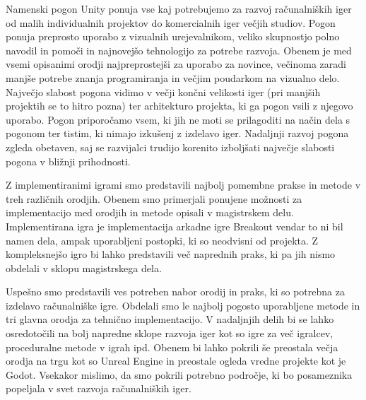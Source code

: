 \documentclass[12pt,a4paper,twoside]{book}
\renewcommand{\headrulewidth}{0pt}
\renewcommand{\headrulewidth}{0pt}
\begin{document}
Namenski pogon Unity ponuja vse kaj potrebujemo za razvoj računalniških iger od malih individualnih projektov do komercialnih iger večjih studiov. Pogon ponuja preprosto uporabo z vizualnih urejevalnikom, veliko skupnostjo polno navodil in pomoči in najnovejšo tehnologijo za potrebe razvoja. Obenem je med vsemi opisanimi orodji najpreprostejši za uporabo za novince, večinoma zaradi manjše potrebe znanja programiranja in večjim poudarkom na vizualno delo. Največjo slabost pogona vidimo v večji končni velikosti iger (pri manjših projektih se to hitro pozna) ter arhitekturo projekta, ki ga pogon vsili z njegovo uporabo. Pogon priporočamo vsem, ki jih ne moti se prilagoditi na način dela s pogonom ter tistim, ki nimajo izkušenj z izdelavo iger. Nadaljnji razvoj pogona zgleda obetaven, saj se razvijalci trudijo korenito izboljšati največje slabosti pogona v bližnji prihodnosti.

Z implementiranimi igrami smo predstavili najbolj pomembne prakse in metode v treh različnih orodjih. Obenem smo primerjali ponujene možnosti za implementacijo med orodjih in metode opisali v magistrskem delu. Implementirana igra je implementacija arkadne igre Breakout vendar to ni bil namen dela, ampak uporabljeni postopki, ki so neodvisni od projekta. Z kompleksnejšo igro bi lahko predstavili več naprednih praks, ki pa jih nismo obdelali v sklopu magistrskega dela.

Uspešno smo predstavili ves potreben nabor orodij in praks, ki so potrebna za izdelavo računalniške igre. Obdelali smo le najbolj pogosto uporabljene metode in tri glavna orodja za tehnično implementacijo. V nadaljnjih delih bi se lahko osredotočili na bolj napredne sklope razvoja iger kot so igre za več igralcev, proceduralne metode v igrah ipd. Obenem bi lahko pokrili še preostala večja orodja na trgu kot so Unreal Engine in preostale ogleda vredne projekte kot je Godot. Vsekakor mislimo, da smo pokrili potrebno področje, ki bo posameznika popeljala v svet razvoja računalniških iger.

\cleardoublepage
{}



\fancypagestyle{priloga}{%
	\fancyhf{}
	\fancyhead[L]{Priloga A}
	\renewcommand{\headrulewidth}{1pt}
	\fancyfoot[LE, RO]{\thepage}
}

\end{document}
